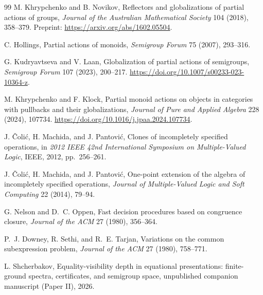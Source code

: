 \begin{thebibliography}{99}
M. Khrypchenko and B. Novikov,
\newblock Reflectors and globalizations of partial actions of groups,
\newblock \emph{Journal of the Australian Mathematical Society} 104 (2018), 358--379.
\newblock Preprint: \url{https://arxiv.org/abs/1602.05504}.

C. Hollings,
\newblock Partial actions of monoids,
\newblock \emph{Semigroup Forum} 75 (2007), 293--316.

G. Kudryavtseva and V. Laan,
\newblock Globalization of partial actions of semigroups,
\newblock \emph{Semigroup Forum} 107 (2023), 200--217.
\newblock \url{https://doi.org/10.1007/s00233-023-10364-z}.

M. Khrypchenko and F. Klock,
\newblock Partial monoid actions on objects in categories with pullbacks and their globalizations,
\newblock \emph{Journal of Pure and Applied Algebra} 228 (2024), 107734.
\newblock \url{https://doi.org/10.1016/j.jpaa.2024.107734}.

J. \v{C}oli\'c, H. Machida, and J. Pantovi\'c,
\newblock Clones of incompletely specified operations,
\newblock in \emph{2012 IEEE 42nd International Symposium on Multiple-Valued Logic}, IEEE, 2012, pp.~256--261.

J. \v{C}oli\'c, H. Machida, and J. Pantovi\'c,
\newblock One-point extension of the algebra of incompletely specified operations,
\newblock \emph{Journal of Multiple-Valued Logic and Soft Computing} 22 (2014), 79--94.

G. Nelson and D.~C. Oppen,
\newblock Fast decision procedures based on congruence closure,
\newblock \emph{Journal of the ACM} 27 (1980), 356--364.

P.~J. Downey, R. Sethi, and R.~E. Tarjan,
\newblock Variations on the common subexpression problem,
\newblock \emph{Journal of the ACM} 27 (1980), 758--771.


L. Shcherbakov,
\newblock Equality-visibility depth in equational presentations: finite-ground
spectra, certificates, and semigroup space,
\newblock unpublished companion manuscript (Paper II), 2026.

\end{thebibliography}

